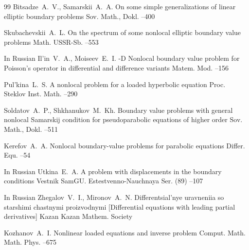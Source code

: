 {\begin{thebibliography}{99}
\by Bitsadze~A.~V., Samarskii~A.~A.
\paper On some simple generalizations of linear elliptic boundary problems
\jour Sov. Math., Dokl.
--400 

\by Skubachevskii~A.~L.
\paper On the spectrum of some nonlocal elliptic boundary value problems
\jour Math. USSR-Sb.
--553

\lang In Russian
\by Il'in~V.~A., Moiseev~E.~I.
-D Nonlocal boundary value problem for Poisson's operator in differential and difference variants
\jour Matem. Mod.
--156


\by Pul'kina~L.~S.
\paper A nonlocal problem for a loaded hyperbolic equation
\jour Proc. Steklov Inst. Math.
--290


\by Soldatov~A.~P., Shkhanukov~M.~Kh.
\paper Boundary value problems with general nonlocal Samarskij condition for pseudoparabolic equations of higher order
\jour Sov. Math., Dokl.
--511 

\by Kerefov~A.~A.
\paper Nonlocal boundary-value problems for parabolic equations
\jour Differ. Equ.
--54 

\lang In Russian
\by Utkina~E.~A.
\paper A problem with displacements in the boundary conditions
\jour Vestnik SamGU. Estestvenno-Nauchnaya Ser.
(89)
--107



\lang In Russian
\by Zhegalov~V.~I., Mironov~A.~N.
\book Differentsial'nye uravneniia so starshimi chastnymi proizvodnymi \rm [Differential equations with leading partial derivatives]
\publaddr Kazan
\publ Kazan Mathem. Society


\by Kozhanov~A.~I.
\paper Nonlinear loaded equations and inverse problem
\jour Comput. Math. Math. Phys.
--675


\end{thebibliography}}
